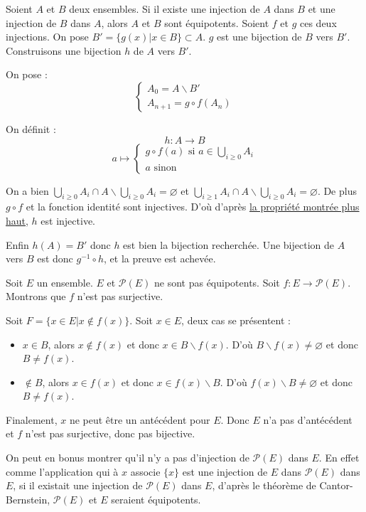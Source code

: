 \begin{theoreme}
	Soient $A$ et $B$ deux ensembles. Si il existe une injection de $A$ dans $B$ et une injection de $B$ dans $A$, alors $A$ et $B$ sont équipotents.
	\tcblower
	Soient  $f$ et $g$ ces deux injections. On pose $B'= \{g(x)|x\in B\} \subset A$. $g$ est une bijection de $B$ vers $B'$. Construisons une bijection $h$ de $A$ vers $B'$. 

	On pose :
	$$\begin{cases}
		A_0 = A\backslash B' \\
		A_{n+1}=g\circ f(A_n)
	\end{cases}$$

	On définit :
	$$ h : A \to B$$
	$$a \mapsto \begin{cases}g \circ f(a) \text{ si } a \in \bigcup_{i\geq 0}A_i \\ a \text{ sinon}\end{cases}$$

	On a bien $\bigcup_{i\geq 0}A_i \cap A\backslash \bigcup_{i\geq 0}A_i=\varnothing$ et $\bigcup_{i\geq 1}A_i \cap A\backslash \bigcup_{i\geq 0}A_i = \varnothing$. De plus $g\circ f$ et la fonction identité sont injectives. D'où d'après \hyperref[recolle]{la propriété montrée plus haut}, $h$ est injective.

	Enfin $h(A)=B'$ donc $h$ est bien la bijection recherchée. Une bijection de $A$ vers $B$ est donc $g^{-1} \circ h$, et la preuve est achevée.
\end{theoreme}

\begin{theoreme}
	Soit $E$ un ensemble. $E$ et $\mathcal{P}(E)$ ne sont pas équipotents.
	\tcblower
	Soit $f : E \to \mathcal{P}(E)$. Montrons que $f$ n'est pas surjective.

	Soit $F=\{x\in E|x\not \in f(x)\}$. Soit $x\in E$, deux cas se présentent :
	\begin{itemize}
		\item $x\in B$, alors $x\not\in f(x)$ et donc $x\in B\backslash f(x)$. D'où $B\backslash f(x)\neq\varnothing$ et donc $B\neq f(x)$.
		\item $\not \in B$, alors $x\in f(x)$ et donc $x\in f(x)\backslash B$. D'où $f(x)\backslash B\neq\varnothing$ et donc $B\neq f(x)$.
	\end{itemize}
	Finalement, $x$ ne peut être un antécédent pour $E$. Donc $E$ n'a pas d'antécédent et $f$ n'est pas surjective, donc pas bijective.

	On peut en bonus montrer qu'il n'y a pas d'injection de $\mathcal{P}(E)$ dans $E$. En effet comme l'application qui à $x$ associe $\{x\}$ est une injection de $E$ dans $\mathcal{P}(E)$ dans $E$, si il existait une injection de $\mathcal{P}(E)$ dans $E$, d'après le théorème de Cantor-Bernstein, $\mathcal{P}(E)$ et $E$ seraient équipotents.
\end{theoreme}

